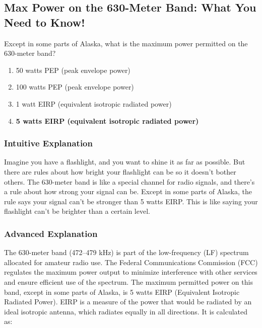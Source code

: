 \subsection{Max Power on the 630-Meter Band: What You Need to Know!}

\begin{tcolorbox}[colback=gray!10!white,colframe=black!75!black,title=E1A09] Except in some parts of Alaska, what is the maximum power permitted on the 630-meter band?
    \begin{enumerate}[label=\Alph*,noitemsep]
        \item 50 watts PEP (peak envelope power)
        \item 100 watts PEP (peak envelope power)
        \item 1 watt EIRP (equivalent isotropic radiated power)
        \item \textbf{5 watts EIRP (equivalent isotropic radiated power)}
    \end{enumerate}
\end{tcolorbox}

\subsubsection{Intuitive Explanation}
Imagine you have a flashlight, and you want to shine it as far as possible. But there are rules about how bright your flashlight can be so it doesn’t bother others. The 630-meter band is like a special channel for radio signals, and there’s a rule about how strong your signal can be. Except in some parts of Alaska, the rule says your signal can’t be stronger than 5 watts EIRP. This is like saying your flashlight can’t be brighter than a certain level.

\subsubsection{Advanced Explanation}
The 630-meter band (472–479 kHz) is part of the low-frequency (LF) spectrum allocated for amateur radio use. The Federal Communications Commission (FCC) regulates the maximum power output to minimize interference with other services and ensure efficient use of the spectrum. The maximum permitted power on this band, except in some parts of Alaska, is 5 watts EIRP (Equivalent Isotropic Radiated Power). EIRP is a measure of the power that would be radiated by an ideal isotropic antenna, which radiates equally in all directions. It is calculated as:

